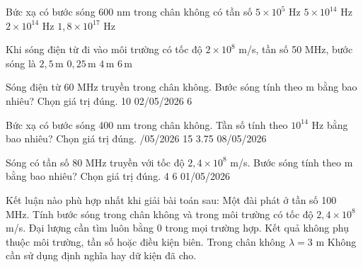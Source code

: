 \begin{ex}
Bức xạ có bước sóng 600 nm trong chân không có tần số
\choice
{$5\times10^5$ Hz}
{\True $5\times10^{14}$ Hz}
{$2\times10^{14}$ Hz}
{$1,8\times10^{17}$ Hz}
\end{ex}

\begin{ex}
Khi sóng điện từ đi vào môi trường có tốc độ $2\times10^8$ m/s, tần số 50 MHz, bước sóng là
\choice
{$2,5\,\text{m}$}
{$0,25\,\text{m}$}
{\True $4\,\text{m}$}
{$6\,\text{m}$}
\end{ex}

\begin{ex}
Sóng điện từ 60 MHz truyền trong chân không. Bước sóng tính theo m bằng bao nhiêu? Chọn giá trị đúng.
\choice
{10}
{02/05/2026}
{6}
{}
\end{ex}

\begin{ex}
Bức xạ có bước sóng 400 nm trong chân không. Tần số tính theo $10^{14}$ Hz bằng bao nhiêu? Chọn giá trị đúng.
\choice
{/05/2026}
{15}
{3.75}
{08/05/2026}
\end{ex}

\begin{ex}
Sóng có tần số 80 MHz truyền với tốc độ $2,4\times10^8$ m/s. Bước sóng tính theo m bằng bao nhiêu? Chọn giá trị đúng.
\choice
{4}
{}
{6}
{01/05/2026}
\end{ex}

\begin{ex}
Kết luận nào phù hợp nhất khi giải bài toán sau: Một đài phát ở tần số 100 MHz. Tính bước sóng trong chân không và trong môi trường có tốc độ $2,4\times10^8$ m/s.
\choice
{Đại lượng cần tìm luôn bằng 0 trong mọi trường hợp.}
{Kết quả không phụ thuộc môi trường, tần số hoặc điều kiện biên.}
{\True Trong chân không $\lambda=3$ m}
{Không cần sử dụng định nghĩa hay dữ kiện đã cho.}
\end{ex}

